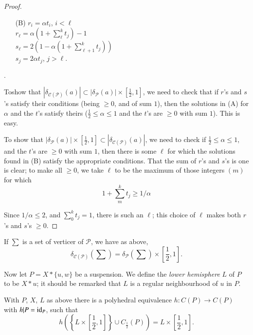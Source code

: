 \begin{proof}
\begin{itemize}
\item[(B)] $r_{i}=\alpha t_{i}$, $i<\ell$\\[4pt]
$r_{\ell}=\alpha(1+\sum^{k}_{\ell}t_{j})-1$\\[4pt]
$s_{\ell}=2(1-\alpha(1+\sum^{k}_{\ell+1}t_{j}))$\\[4pt]
$s_{j}=2\alpha t_{j}$, $j>\ell$.
\end{itemize}
.

To\pageoriginale show that $|\delta_{\mathscr{C}(\mathscr{P})}(a)|\subset |\delta_{\mathscr{P}}(a)|\times[\frac{1}{2},1]$, we need to check that if $r$'s and $s$'s satisfy their conditions (being $\geq 0$, and of sum $1$), then the solutions in (A) for $\alpha$ and the $t$'s satisfy theirs ($\frac{1}{2}\leq \alpha \leq 1$ and the $t$'s are $\geq 0$ with sum $1$). This is easy.

To show that $|\delta_{\mathscr{P}}(a)|\times [\frac{1}{2},1]\subset |\delta_{\mathscr{C}(\mathscr{P})}(a)|$, we need to check if $\frac{1}{2}\leq \alpha\leq 1$, and the $t$'s are $\geq 0$ with sum $1$, then there is some $\ell$ for which the solutions found in (B) satisfy the appropriate conditions. That the sum of $r$'s and $s$'s is one is clear; to make all $\geq 0$, we take $\ell$ to be the maximum of those integers $(m)$ for which 
$$
1+\sum^{k}_{m}t_{j}\geq 1/\alpha
$$

Since $1/\alpha\leq 2$, and $\sum^{k}_{0}t_{j}=1$, there is such an $\ell$; this choice of $\ell$ makes both $r$'s and $s$'s $\geq 0$.
\end{proof}

\begin{remark*}
If $\sum$ is a set of verticer of $\mathscr{P}$, we have as above, 
$$
\delta_{\mathscr{C}(\mathscr{P})}(\sum)=\delta_{\mathscr{P}}(\sum)\times[\frac{1}{2},1]. 
$$

Now let $P=X\ast \{u,w\}$ be a suspension. We define the {\em lower hemisphere} $L$ of $P$ to be $X\ast u$; it should be remarked that $L$ is a regular neighbourhood of $u$ in $P$.
\end{remark*}

\begin{proposition}\label{chap6-prop6.8.4}
With $P$, $X$, $L$ as above there is a polyhedral equivalence $h:C(P)\to C(P)$ with $h|P=\text{\rm id}_{P}$, such that 
$$
h\left(\left\{L\times \left[\frac{1}{2},1\right]\right\}\cup C_{\frac{1}{2}}(P)\right)=L\times \left[\frac{1}{2},1\right].
$$
\end{proposition}

